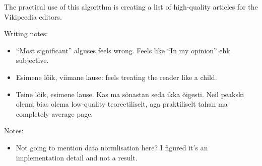 The practical use of this algorithm is creating a list of high-quality articles
for the Vikipeedia editors.

Writing notes:

\begin{itemize}
  \item ``Most significant'' alguses feels wrong. Feels like ``In my opinion''
  ehk subjective.
  \item Esimene lõik, viimane lause: feels treating the reader like a child.
  \item Teine lõik, esimene lause. Kas ma sõnastan seda ikka õigesti. Neil
  peakski olema bias olema low-quality teoreetiliselt, aga praktiliselt tahan ma
  completely average page.
\end{itemize}

Notes:

\begin{itemize}
  \item Not going to mention data normlisation here? I figured it's an
  implementation detail and not a result.
\end{itemize}
